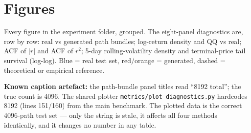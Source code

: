 \documentclass[11pt,a4paper]{article}
\begin{document}
\section{Figures}

Every figure in the experiment folder, grouped. The eight-panel diagnostics are,
row by row: real vs generated path bundles; log-return density and QQ vs real;
ACF of $|r|$ and ACF of $r^2$; 5-day rolling-volatility density and
terminal-price tail survival (log-log). Blue = real test set, red/orange =
generated, dashed = theoretical or empirical reference.

\textbf{Known caption artefact:} the path-bundle panel titles read ``8192
total''; the true count is 4096. The shared plotter
\texttt{metrics/plot\_diagnostics.py} hardcodes 8192 (lines 151/160) from the
main benchmark. The plotted data is the correct 4096-path test set --- only the
string is stale, it affects all four methods identically, and it changes no
number in any table.
\end{document}
